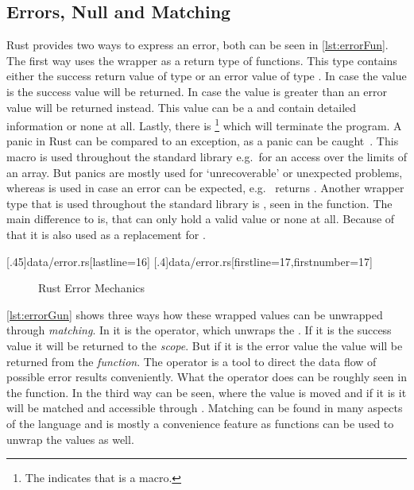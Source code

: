 \documentclass[thesis]{subfiles}
\begin{document}
  \subsection{Errors, Null and Matching}\label{sec:rustErr}
    Rust provides two ways to express an error, both can be seen in \autoref{lst:errorFun}.
    The first way uses the  wrapper as a return type of functions.
    This type contains either the success return value of type \T or an error value of type .
    In case the value is  the success value will be returned.
    In case the value is greater than  an error value will be returned instead.
    This value can be a \struct and contain detailed information or none at all.
    Lastly, there is \footnote{%
      The \codr{!} indicates that  is a macro.
    } which will terminate the program.
    A panic in Rust can be compared to an exception, as a panic can be caught~\autocite[std::panic::catch\_unwind]{rust-doc}.
    This macro is used throughout the standard library e.g.~for an access over the limits of an array.
    But panics are mostly used for `unrecoverable' or unexpected problems, whereas  is used in case an error can be expected, e.g.~ returns .
    Another wrapper type that is used throughout the standard library is \OptionT, seen in the  function.
    The main difference to  is, that  can only hold a valid value or none at all.
    Because of that it is also used as a replacement for .

    \LstTikzBox{\errorFun}[.45\linewidth]{data/error.rs}[lastline=16]
    \LstTikzBox{\errorGun}[.4\linewidth]{data/error.rs}[firstline=17,firstnumber=17]

    \begin{figure}[ht]
      \captionsetup{type=lstlisting}
       \hfill%
      \caption{Rust Error Mechanics}\label{lst:error}
    \end{figure}

    \autoref{lst:errorGun} shows three ways how these wrapped values can be unwrapped through \emph{matching}.
    In  it is the  operator, which unwraps the .
    If it is the success value it will be returned to the \emph{scope}.
    But if it is the error value the value will be returned from the \emph{function}.
    The  operator is a tool to direct the data flow of possible error results conveniently.
    What the  operator does can be roughly seen in the  function.
    In  the third way can be seen, where the \OptionT value is moved and if it is \Some it will be matched and accessible through .
    Matching can be found in many aspects of the language and is mostly a convenience feature as functions can be used to unwrap the values as well.%
    ~\autocite[Enums and Pattern Matching]{rust-doc}
\end{document}
